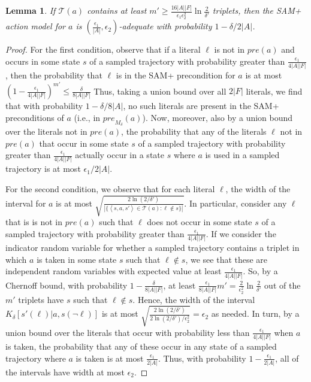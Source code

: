 \documentclass[letterpaper]{article} %
\newtheorem{lemma}{Lemma}
\newcommand{\pre}{\textit{pre}}
\newcommand{\tuple}[1]{\ensuremath{\left \langle #1 \right \rangle }}
\begin{document}
\begin{lemma}\label{lem:sam-adequate}
If $\mathcal{T}(a)$ contains at least
$
m' \geq \frac{16|A||F|}{\epsilon_1\epsilon_2^2}\ln\frac{2}{\delta'}
$
triplets, then the SAM+ action model for $a$ is
$(\frac{\epsilon_1}{|A|},\epsilon_2)$-adequate with probability $1-\delta/2|A|$.
\end{lemma}
\begin{proof}
For the first condition, observe that if a literal $\ell$ is not in $\pre(a)$ and occurs in some state $s$ of a sampled trajectory with probability greater than $\frac{\epsilon_1}{4|A||F|}$, then the probability that $\ell$ is in the SAM+ precondition for $a$ is at most
$
(1-\frac{\epsilon_1}{4|A||F|})^{m'}\leq \frac{\delta}{8|A||F|}
$
Thus, taking a union bound over all $2|F|$ literals, we find that with probability $1-\delta/8|A|$, no such literals are present in the SAM+ preconditions of $a$ (i.e., in $\pre_{M_\delta}(a)$). Now, moreover, also by a union bound over the literals not in $\pre(a)$, the probability that any of the literals $\ell$ not in $\pre(a)$ that occur in some state $s$ of a sampled trajectory with probability greater than $\frac{\epsilon_1}{4|A||F|}$ actually occur in a state $s$ where $a$ is used in a sampled trajectory is at most $\epsilon_1/2|A|$.

For the second condition, we observe that for each literal $\ell$, the width of the interval for $a$ is at most $\sqrt{\frac{2\ln(2/\delta')}{|\{\tuple{s, a, s'}\in \mathcal{T}(a):\ell\notin s\}|}}$. In particular, consider any $\ell$ that is is not in $\pre(a)$ such that $\ell$ does not occur in some state $s$ of a sampled trajectory with probability greater than $\frac{\epsilon_1}{4|A||F|}$. If we consider the indicator random variable for whether a sampled trajectory contains a triplet in which $a$ is taken in some state $s$ such that $\ell\notin s$, we see that these are independent random variables with expected value at least $\frac{\epsilon_1}{4|A||F|}$. 
So, by a Chernoff bound, with probability $1-\frac{\delta}{8|A||F|}$, at least $\frac{\epsilon_1}{8|A||F|}m'=\frac{2}{\epsilon_2^2}\ln\frac{2}{\delta'}$ out of the $m'$ triplets have $s$ such that $\ell\notin s$. Hence, the width of the interval $K_\delta[s'(\ell)|a,s(\neg\ell)]$ is at most
$
\sqrt{\frac{2\ln(2/\delta')}{2\ln(2/\delta')/\epsilon_2^2}}=\epsilon_2
$
as needed. 
In turn, by a union bound over the literals that occur with probability less than $\frac{\epsilon_1}{4|A||F|}$ when $a$ is taken, the probability that any of these occur in any state of a sampled trajectory where $a$ is taken is at most $\frac{\epsilon_1}{2|A|}$. Thus, with probability $1-\frac{\epsilon_1}{2|A|}$, all of the intervals have width at most $\epsilon_2$.


\end{proof}
\end{document}
